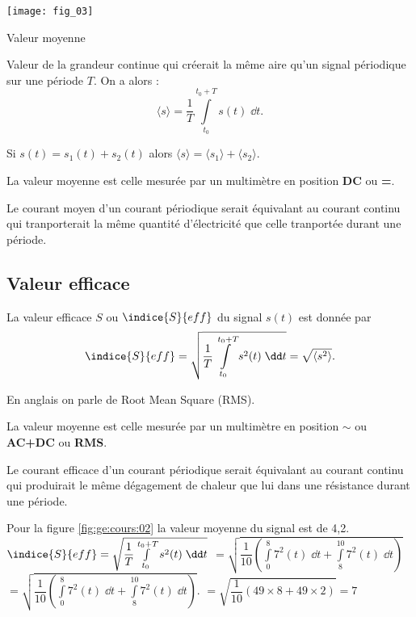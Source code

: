 \begin{marginfigure}
\texttt{[image: fig\_03]}
\caption{Valeur moyenne\label{fig:ge:cours:03}}
\end{marginfigure}

\begin{defi}
Valeur de la grandeur continue qui créerait la même aire qu'un signal périodique sur une période $T$.
On a alors : 
$$\langle s \rangle = \dfrac{1}{T} \int\limits_{t_0}^{t_0+T} s(t)\; \dd t.$$
\end{defi}

\begin{prop}
Si $s(t) = s_1(t)+s_2(t)$ alors  $\langle s \rangle = \langle s_1 \rangle+\langle s_2 \rangle$.
\end{prop}

La valeur moyenne est celle mesurée par un multimètre en position \textbf{DC} ou \textbf{=}.

Le courant moyen d'un courant périodique serait équivalant au courant continu qui tranporterait la même quantité d'électricité que celle tranportée durant une période.

\subsection{Valeur efficace}
\begin{defi}
La valeur efficace $S$ ou $\indice{S}{eff}$ du signal $s(t)$ est donnée par  
$$\indice{S}{eff} = \sqrt{\dfrac{1}{T} \int\limits_{t_0}^{t_0+T} s^2(t)\; \dd t} = \sqrt{\langle s^2 \rangle}.$$

En anglais on parle de Root Mean Square (RMS).
\end{defi}


La valeur moyenne est celle mesurée par un multimètre en position $\sim$ 
ou \textbf{AC+DC} ou \textbf{RMS}.

Le courant efficace d'un courant périodique serait équivalant au courant continu qui produirait le même dégagement de chaleur que lui dans une résistance durant une période.

Pour la figure \ref{fig:ge:cours:02} la valeur moyenne du signal est de 4,2.
$\indice{S}{eff} = \sqrt{\dfrac{1}{T} \int\limits_{t_0}^{t_0+T} s^2(t)\; \dd t}$
$=\sqrt{\dfrac{1}{10} \left( \int\limits_{0}^{8} 7^2(t)\; \dd t + \int\limits_{8}^{10} 7^2(t)\; \dd t\right)}$
$=\sqrt{\dfrac{1}{10} \left( \int\limits_{0}^{8} 7^2(t)\; \dd t + \int\limits_{8}^{10} 7^2(t)\; \dd t\right)}.$
$=\sqrt{\dfrac{1}{10} \left( 49 \times 8 + 49 \times 2\right)}=7$



